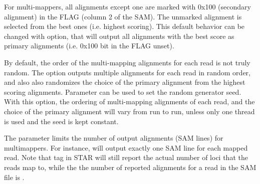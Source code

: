 \documentclass[12pt]{article}
\begin{document}
For multi-mappers, all alignments except one are marked with 0x100 (secondary alignment) in the FLAG (column 2 of the SAM). The unmarked alignment is selected from the best ones (i.e. highest scoring). This default behavior can be changed with   option, that will output all alignments with the best score as primary alignments (i.e. 0x100 bit in the FLAG unset).

By default, the order of the multi-mapping alignments for each read is not truly random.
The   option outputs multiple alignments for each read in random order, and also also randomizes the choice of the primary alignment from the highest scoring alignments. Parameter  can be used to set the random generator seed. With this option, the ordering of multi-mapping alignments of each read, and the choice of the primary alignment will vary from run to run, unless only one thread is used and the seed is kept constant.

The  parameter limits the number of output alignments (SAM lines) for multimappers. For instance,   will output exactly one SAM line for each mapped read. Note that  tag in STAR will still report the actual number of loci that the reads map to, while the the number of reported alignments for a read in the SAM file is .
\end{document}

